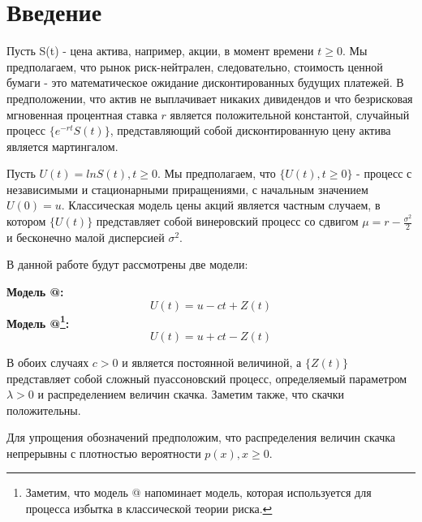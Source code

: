 \documentclass[a4paper,12pt]{article}
\makeatletter
\theoremstyle{definition}
\newcommand*{\rom}[1]{\expandafter\@slowromancap\romannumeral #1@}
\makeatother
\begin{document}

\section{Введение}

Пусть S(t) - цена актива, например, акции, в момент времени $t \ge 0$. Мы предполагаем, что рынок риск-нейтрален, следовательно, стоимость ценной бумаги - это математическое ожидание дисконтированных будущих платежей. В предположении, что актив не выплачивает никаких дивидендов и что безрисковая мгновенная процентная ставка $r$ является положительной константой, случайный процесс $\{e^{-rt} S(t)\}$, представляющий собой дисконтированную цену актива  является мартингалом.

Пусть $U(t) = ln S(t), t \ge 0$. Мы предполагаем, что $\{U(t), t \ge 0\}$ - процесс с независимыми и стационарными приращениями, с начальным значением $U(0) = u$. Классическая модель цены акций является частным случаем, в котором $\{U(t)\}$ представляет собой винеровский процесс со сдвигом $\mu = r - \frac{\sigma ^ {2}}{2}$ и бесконечно малой дисперсией $\sigma ^ {2}$. 

В данной работе будут рассмотрены две модели:

\textbf{Модель \rom{1}:}
\begin{equation}\label{eq:model1_definition}
    U(t) = u - ct + Z(t)
\end{equation}
\textbf{Модель \rom{2}\footnote{Заметим, что модель \rom{2} напоминает модель, которая используется для процесса избытка в классической теории риска.}:} 
\begin{equation}\label{eq:model2_definition}
    U(t) = u + ct - Z(t)
\end{equation}

В обоих случаях $c > 0$ и является постоянной величиной, а $\{Z(t)\}$ представляет собой сложный пуассоновский процесс, определяемый параметром $\lambda > 0$ и распределением величин скачка. Заметим также, что скачки положительны.

\label{sec:positivityOfJumsAssumption} Для упрощения обозначений предположим, что распределения величин скачка
непрерывны с плотностью вероятности $p(x), x \ge 0$. 
\end{document}

